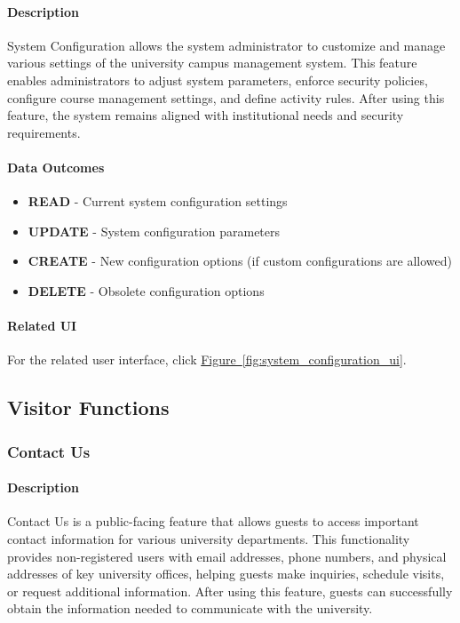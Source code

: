 \documentclass[12pt]{article}
\begin{document}
\paragraph{Description}
System Configuration allows the system administrator to customize and manage various settings of the university campus management system. This feature enables administrators to adjust system parameters, enforce security policies, configure course management settings, and define activity rules. After using this feature, the system remains aligned with institutional needs and security requirements.

\paragraph{Data Outcomes}
\begin{itemize}
    \item \textbf{READ} - Current system configuration settings
    \item \textbf{UPDATE} - System configuration parameters
    \item \textbf{CREATE} - New configuration options (if custom configurations are allowed)
    \item \textbf{DELETE} - Obsolete configuration options
\end{itemize}

\paragraph{Related UI}
For the related user interface, click \hyperref[fig:system_configuration_ui]{Figure~\ref*{fig:system_configuration_ui}}.

\subsection{Visitor Functions}
\subsubsection{Contact Us}

\paragraph{Description}
Contact Us is a public-facing feature that allows guests to access important contact information for various university departments. This functionality provides non-registered users with email addresses, phone numbers, and physical addresses of key university offices, helping guests make inquiries, schedule visits, or request additional information. After using this feature, guests can successfully obtain the information needed to communicate with the university.
\end{document}
